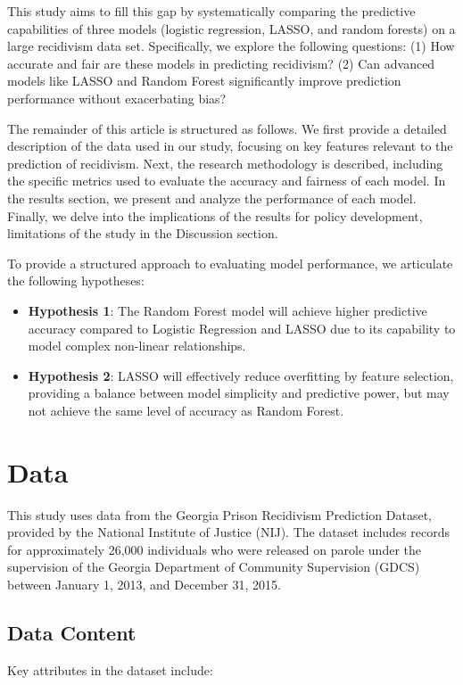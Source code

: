 \documentclass[12pt]{article}
\begin{document}
This study aims to fill this gap by systematically comparing the predictive capabilities of three models (logistic regression, LASSO, and random forests) on a large recidivism data set. Specifically, we explore the following questions: (1) How accurate and fair are these models in predicting recidivism? (2) Can advanced models like LASSO and Random Forest significantly improve prediction performance without exacerbating bias? 

The remainder of this article is structured as follows. We first provide a detailed description of the data used in our study, focusing on key features relevant to the prediction of recidivism. Next, the research methodology is described, including the specific metrics used to evaluate the accuracy and fairness of each model. In the results section, we present and analyze the performance of each model. Finally, we delve into the implications of the results for policy development, limitations of the study in the Discussion section.

To provide a structured approach to evaluating model performance, we articulate the following hypotheses:

\begin{itemize}
    \item \textbf{Hypothesis 1}: The Random Forest model will achieve higher predictive accuracy compared to Logistic Regression and LASSO due to its capability to model complex non-linear relationships.
    \item \textbf{Hypothesis 2}: LASSO will effectively reduce overfitting by feature selection, providing a balance between model simplicity and predictive power, but may not achieve the same level of accuracy as Random Forest.
\end{itemize}

\section{Data}

This study uses data from the Georgia Prison Recidivism Prediction Dataset, provided by the National Institute of Justice (NIJ). The dataset includes records for approximately 26,000 individuals who were released on parole under the supervision of the Georgia Department of Community Supervision (GDCS) between January 1, 2013, and December 31, 2015. 

\subsection{Data Content}
Key attributes in the dataset include:
\end{document}

